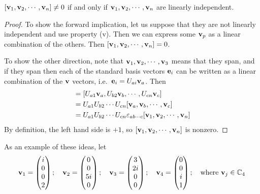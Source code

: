 \begin{proposition}
	\([ \vb v_1, \vb v_2, \cdots, \vb v_n] \neq 0\) if and only if \(\vb v_1, \vb v_2, \cdots, \vb v_n\) are linearly independent.
\end{proposition}
\begin{proof}
	To show the forward implication, let us suppose that they are not linearly independent and use property (v).
	Then we can express some \(\vb v_p\) as a linear combination of the others.
	Then \([\vb v_1, \vb v_2, \cdots, \vb v_n] = 0\).

	To show the other direction, note that \(\vb v_1, \vb v_2, \cdots, \vb v_3\) means that they span, and if they span then each of the standard basis vectors \(\vb e_i\) can be written as a linear combination of the \(\vb v\) vectors, i.e.\ \(\vb e_i = U_{ai} \vb v_a\).
	Then
	\begin{align*}
		[\vb e_1, \vb e_2, \cdots, \vb e_n] & = [U_{a1}\vb v_a, U_{b2}\vb v_b, \cdots, U_{cn}\vb v_c]                                 \\
		                                    & = U_{a1}U_{b2}\cdots U_{cn}[\vb v_a, \vb v_b, \cdots, \vb v_c]                          \\
		                                    & = U_{a1}U_{b2}\cdots U_{cn} \varepsilon_{ab\cdots c}[\vb v_1, \vb v_2, \cdots, \vb v_n]
	\end{align*}
	By definition, the left hand side is \(+1\), so \([\vb v_1, \vb v_2, \cdots, \vb v_n]\) is nonzero.
\end{proof}
As an example of these ideas, let
\[
	\vb v_1 = \begin{pmatrix} i \\ 0 \\ 0 \\ 2 \end{pmatrix};\quad\vb v_2 = \begin{pmatrix} 0 \\ 0 \\ 5i \\ 0 \end{pmatrix};\quad\vb v_3 = \begin{pmatrix} 3 \\ 2i \\ 0 \\ 0 \end{pmatrix};\quad\vb v_4 = \begin{pmatrix} 0 \\ 0 \\ i \\ 1 \end{pmatrix};\quad \text{where }\vb v_j \in \mathbb C_4
\]
